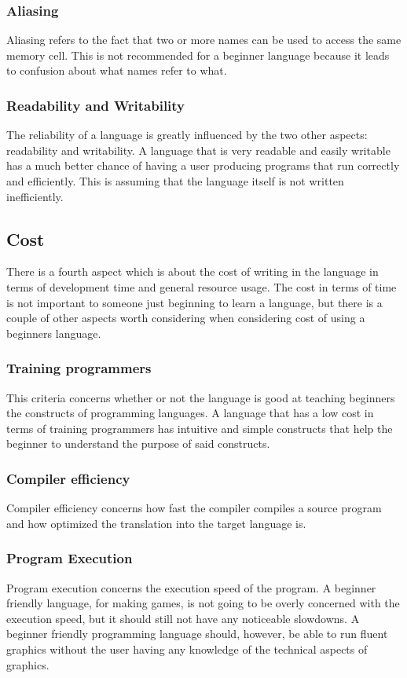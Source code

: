 \subsubsection{Aliasing}
Aliasing refers to the fact that two or more names can be used to access the same memory cell. This is not recommended for a beginner language because it leads to confusion about what names refer to what. 
\subsubsection{Readability and Writability}
The reliability of a language is greatly influenced by the two other aspects: readability and writability. A language that is very readable and easily writable has a much better chance of having a user producing programs that run correctly and efficiently. This is assuming that the language itself is not written inefficiently.
\subsection{Cost}
There is a fourth aspect which is about the cost of writing in the language in terms of development time and general resource usage. The cost in terms of time is not important to someone just beginning to learn a language, but there is a couple of other aspects worth considering when considering cost of using a beginners language.
\subsubsection{Training programmers}
This criteria concerns whether or not the language is good at teaching beginners the constructs of programming languages. A language that has a low cost in terms of training programmers has intuitive and simple constructs that help the beginner to understand the purpose of said constructs.
\subsubsection{Compiler efficiency}
Compiler efficiency concerns how fast the compiler compiles a source program and how optimized the translation into the target language is.


\subsubsection{Program Execution}
Program execution concerns the execution speed of the program. A beginner friendly language, for making games, is not going to be overly concerned with the execution speed, but it should still not have any noticeable slowdowns. A beginner friendly programming language should, however, be able to run fluent graphics without the user having any knowledge of the technical aspects of graphics.
\newpage

